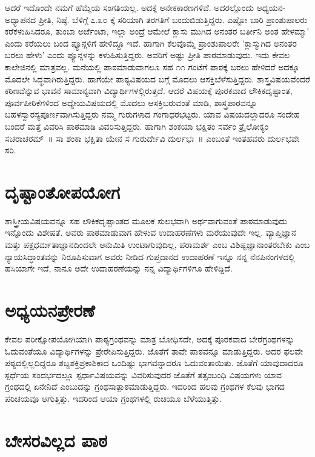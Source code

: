 {ಆದರೆ ಇದೊಂದೇ ನಮಗೆ ಹೆಮ್ಮೆಯ ಸಂಗತಿಯಲ್ಲ. ಅದಕ್ಕೆ ಅನೇಕಕಾರಣಗಳಿವೆ. ಅದರಲ್ಲೊಂದು ಅಧ್ಯಯನ-ಅಧ್ಯಾಪನದ ಪ್ರೀತಿ, ನಿಷ್ಠೆ. ಬೆಳಿಗ್ಗೆ ೭.೩೦ ಕ್ಕೆ ಸರಿಯಾಗಿ ತರಗತಿಗೆ ಬಂದುಬಿಡುತ್ತಿದ್ದರು. ಎಷ್ಟೋ ಬಾರಿ ಪ್ರಾಂಶುಪಾಲರು ಕರೆಕಳುಹಿಸಿದರೂ, ತುಂಬಾ ಅರ್ಜೆಂಟಾ, ಇಲ್ಲಾ ಅಂದ್ರೆ ಆಮೇಲೆ ಕ್ಲಾಸು ಮುಗಿದ ಅನಂತರ ಬರ್ತೀನಿ ಅಂತ ಹೇಳಮ್ಮಾ’ ಎಂದು ಕರೆಯಲು ಬಂದ ಪ್ಯೂನ್ಗಳಿಗೆ ಹೇಳಿದ್ದೂ ಇದೆ. ಹಾಗಾಗಿ ಕೆಲವೊಮ್ಮೆ ಪ್ರಾಂಶುಪಾಲರೇ ’ಕ್ಲಾಸ್ಮುಗಿದ ಅನಂತರ ಬರಲು ಹೇಳು’ ಎಂದು ಪ್ಯೂನ್ಗಳನ್ನು ಕಳುಹಿಸುತ್ತಿದ್ದರು. ಅವರಿಗೆ ಅಷ್ಟು ಪ್ರೀತಿ ಪಾಠಮಾಡುವುದು. ಇದು ಕೇವಲ ಕಾಲೇಜಿನಲ್ಲಿ ಮಾತ್ರವಲ್ಲ. ಮನೆಯಲ್ಲಿ ಪಾಠಮಾಡುವಾಗಲೂ ಸಹ ೧೧ ಗಂಟೆಗೆ ಪಾಠಕ್ಕೆ ಬರಲು ಹೇಳಿದರೆ ಅದಕ್ಕೂ ಮೊದಲೇ ಸಿದ್ಧವಾಗಿರುತ್ತಿದ್ದರು.
ಹಾಗೆಯೇ ಪಾಠ್ಯವಿಷಯದ ಬಗ್ಗೆ ಮೊದಲು ಆಸಕ್ತಿಬೆಳೆಸುತ್ತಿದ್ದರು. ಶಾಸ್ತ್ರವಿಷಯವೆಂದರೆ ಕಠಿಣವೆನ್ನುವ ಭಾವನೆ ಸಾಮಾನ್ಯವಾಗಿ ವಿದ್ಯಾರ್ಥಿಗಳಲ್ಲಿರುತ್ತದೆ. ಆದರೆ ವಿಷಯಕ್ಕೆ ಪೂರಕವಾದ ಲೌಕಿಕದೃಷ್ಟಾಂತ, ಪೂರ್ವಪೀಠಿಕೆಗಳಿಂದ ಅಧ್ಯೇಯವಿಷಯದಲ್ಲಿ ಮೊದಲು ಆಸಕ್ತಿಬರುವಂತೆ ಮಾಡಿ, ಶಾಸ್ತ್ರಪಾಠವನ್ನೂ ಬಹಳಸ್ವಾರಸ್ಯಪೂರ್ಣವಾಗಿಸುತ್ತಿದ್ದರು ನಮ್ಮ ಗುರುಗಳಾದ ಗಂಗಾಧರಭಟ್ಟರು. ಯಾವ ವಿಷಯದಲ್ಲಾದರೂ ಸಂದೇಹ ಬಂದರೆ ಮತ್ತೆ ವಿವರಿಸಿ ಪಾಠಮಾಡಿ ವಿವರಿಸುತ್ತಿದ್ದರು. ಹಾಗಾಗಿ ಶಂಕಯಾ ಭಕ್ಷಿತಂ ಸರ್ವಂ ತ್ರೈಲೋಕ್ಯಂ ಸಚರಾಚರಮ್~॥ ಸಾ ಶಂಕಾ ಭಕ್ಷಿತಾ ಯೇನ ಸ ಗುರುರ್ದೇವಿ ದುರ್ಲಭಃ~॥ ಎಂಬಂತೆ ಇಂತಹವರು ದುರ್ಲಭವೇ ಸರಿ.

\section*{ದೃಷ್ಟಾಂತೋಪಯೋಗ}

ಶಾಸ್ತ್ರೀಯವಿಷಯವನ್ನೂ ಸಹ ಲೌಕಿಕದೃಷ್ಟಾಂತದ ಮೂಲಕ ಸುಲಭವಾಗಿ ಅರ್ಥವಾಗುವಂತೆ ಪಾಠಮಾಡುವುದು ಇನ್ನೊಂದು ವಿಶೇಷತೆ. ಅವರು ಪಾಠಮಾಡುವಾಗ ಹೇಳುವ ಉದಾಹರಣೆಗಳು ಮರೆಯುವುದೇ ಇಲ್ಲ. ವ್ಯಾಪ್ತಿಜ್ಞಾನ ಮತ್ತು ಪಕ್ಷಧರ್ಮತಾಜ್ಞಾನದಿಂದಲೇ ಅನುಮಿತಿ ಉಂಟಾಗುವುದಿಲ್ಲ, ಪರಾಮರ್ಶ ಎಂಬ ವಿಶಿಷ್ಟಜ್ಞಾನಾಂತರಬೇಕು ಎಂಬ ನ್ಯಾಯಸಿದ್ಧಾಂತವನ್ನು ನಿರೂಪಿಸುವಾಗ ಅವರು ನೀಡಿದ ಗುಪ್ತದಾನದ ಉದಾಹರಣೆ ಇನ್ನೂ ನನ್ನ ನೆನಪಿನಂಗಳದಲ್ಲಿ ಹಸಿಯಾಗೇ ಇದೆ, ನಾನೂ ಅದೇ ಉದಾಹರಣೆಯನ್ನು ನನ್ನ ವಿದ್ಯಾರ್ಥಿಗಳಿಗೂ ಹೇಳಿದ್ದಿದೆ.

\section*{ಅಧ್ಯಯನಪ್ರೇರಣೆ}

ಕೇವಲ ಪರೀಕ್ಷೋಪಯೋಗಿಯಾಗಿ ಪಾಠ್ಯಗ್ರಂಥವನ್ನು ಮಾತ್ರ ಬೋಧಿಸದೇ, ಅದಕ್ಕೆ ಪೂರಕವಾದ ಬೇರೆಗ್ರಂಥಗಳನ್ನು ಓದುವಂತೆಯೂ ವಿದ್ಯಾರ್ಥಿಗಳನ್ನು ಪ್ರೇರೇಪಿಸುತ್ತಿದ್ದರು. ಜೊತೆಗೆ ತಾವೇ ಪಾಠವನ್ನೂ ಮಾಡುತ್ತಿದ್ದರು. ಅದರ ಫಲವೇ ಪಠ್ಯದಲ್ಲಿಲ್ಲದಿದ್ದರೂ ಶಬ್ದಶಕ್ತಿಪ್ರಕಾಶಿಕಾದ ಒಂದಿಷ್ಟು ಭಾಗವನ್ನಾದರೂ ಓದುವಂತಾಯಿತು. ಜೊತೆಗೆ ಯಾವುದಾದರೂ ಸ್ಪರ್ಧೆಯ ಸಂದರ್ಭದಲ್ಲೂ ಸ್ಪರ್ಧಾವಿಷಯವನ್ನು ವಿವರಿಸುವುದರ ಜೊತೆಗೆ ತತ್ಸಂಬಂಧಿ ವಿಷಯಗಳು ಯಾವ ಗ್ರಂಥದಲ್ಲಿ ಏನೇನಿದೆ ಎಂಬುದನ್ನು ಗ್ರಂಥಸಾತ್ಪಾಠಮಾಡುತ್ತಿದ್ದರು. ಇದರಿಂದ ಹಲವು ಗ್ರಂಥಗಳ ಕೆಲವು ಭಾಗದ ಪರಿಚಯವೂ ಆಗುತ್ತಿತ್ತು. ಇದರಿಂದ ಆಯಾ ಗ್ರಂಥಗಳಲ್ಲಿ ರುಚಿಯೂ ಬೆಳೆಯುತ್ತಿತ್ತು.

\section*{ಬೇಸರವಿಲ್ಲದ ಪಾಠ}

}
